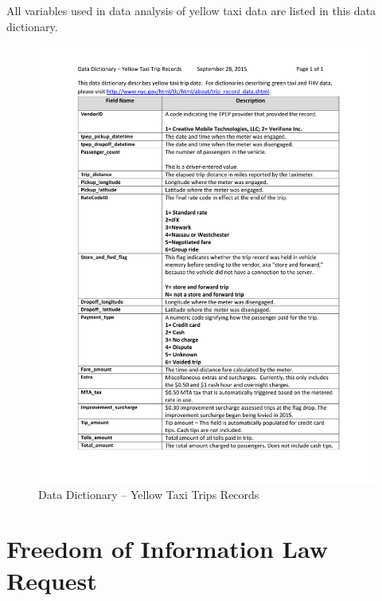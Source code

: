 \documentclass[12pt,twoside]{reedthesis}
\theoremstyle{definition}
\theoremstyle{definition}
\theoremstyle{definition}
\theoremstyle{remark}
\begin{document}
All variables used in data analysis of yellow taxi data are listed in
this data dictionary.
\begin{figure}[h]

{\centering \includegraphics[width=6.38in]{figure/data_dictionary_trip_records_yellow} 

}

\caption{Data Dictionary -- Yellow Taxi Trips Records}\label{fig:datadic}
\end{figure}
\chapter{Freedom of Information Law
Request}\label{freedom-of-information-law-request}
\end{document}
